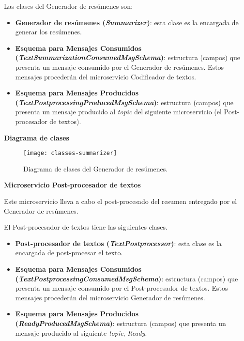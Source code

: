 Las clases del Generador de resúmenes son:

\vspace{-0.2cm}
\begin{itemize} [\textbullet]
	\item \textbf{Generador de resúmenes (\emph{Summarizer})}: esta clase es la encargada de generar los resúmenes.
	
	\item \textbf{Esquema para Mensajes Consumidos \\ (\emph{TextSummarizationConsumedMsgSchema})}: estructura (campos) que presenta un mensaje consumido por el Generador de resúmenes. Estos mensajes procederán del microservicio Codificador de textos.
	
	\item \textbf{Esquema para Mensajes Producidos \\ (\emph{TextPostprocessingProducedMsgSchema})}: estructura (campos) que presenta un mensaje producido al \emph{topic} del siguiente microservicio (el Post-procesador de textos).
\end{itemize}

\noindent
\textbf{Diagrama de clases}

\begin{figure}[h]
	\centering
	\texttt{[image: classes-summarizer]}
	\vspace{-0.5cm}
	\caption{Diagrama de clases del Generador de resúmenes.}
\end{figure}



\noindent
\textbf{\large Microservicio Post-procesador de textos}

Este microservicio lleva a cabo el post-procesado del resumen entregado por el Generador de resúmenes.

El Post-procesador de textos tiene las siguientes clases.

\vspace{-0.2cm}
\begin{itemize} [\textbullet]
	\item \textbf{Post-procesador de textos (\emph{TextPostprocessor})}: esta clase es la encargada de post-procesar el texto.
	
	\item \textbf{Esquema para Mensajes Consumidos \\ (\emph{TextPostprocessingConsumedMsgSchema})}: estructura (campos) que presenta un mensaje consumido por el Post-procesador de textos. Estos mensajes procederán del microservicio Generador de resúmenes.
	
	\item \textbf{Esquema para Mensajes Producidos \\ (\emph{ReadyProducedMsgSchema})}: estructura (campos) que presenta un mensaje producido al siguiente \emph{topic}, \emph{Ready}.
\end{itemize}

